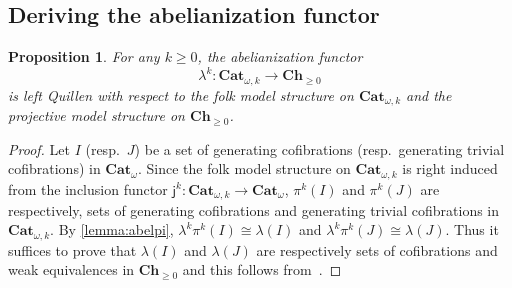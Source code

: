 \documentclass[reqno]{amsart}
\theoremstyle{plain}
\newtheorem{proposition}[subsubsection]{Proposition}
\theoremstyle{definition}
\theoremstyle{remark}
\newcommand{\ctg}[1]{\mathbf{#1}}  %
\newcommand{\Cat}{\ctg{Cat}}   %
\newcommand{\nCat}[1]{\Cat_{#1}}  %
\newcommand{\opCat}[1]{\Cat_{\omega,#1}} %
\newcommand{\oCat}{\nCat{\omega}} %
\newcommand{\Ch}[1]{\ctg{Ch}_{#1}} %
\newcommand{\Chp}{\Ch{\geq 0}} %
\newcommand{\functor}[1]{\mathsf{#1}} %
\newcommand{\emb}[2]{\functor{j}_{#2}^{#1}}%
\newcommand{\pifun}[2]{\functor{\pi}_{#2}^{#1}}%
\newcommand{\oemb}[1]{\emb{#1}{}}%
\newcommand{\opifun}[1]{\pifun{#1}{}}%
\newcommand{\abel}{\functor{\lambda}} %
\newcommand{\abelk}[1]{\functor{\abel}^{#1}}%
\begin{document}
\subsection{Deriving the abelianization functor}\label{subsec:abelderiv}
\begin{proposition}\label{prop:abelquillen}
  For any $k \geq 0$, the abelianization functor
  \[
    \abelk{k} \colon \opCat{k} \to \Chp
  \]
  is left Quillen with respect to the folk model structure on
  $\opCat k$ and the projective model structure on $\Chp$.
\end{proposition}
\begin{proof}
   Let $I$ (resp.\ $J$) be a set of generating cofibrations (resp.\ generating
  trivial cofibrations) in $\oCat$. Since the folk model structure on
  $\opCat k$ is right induced from
  the inclusion functor $\oemb{k} \colon \opCat{k} \to \oCat$,
  $\opifun k(I)$ and $\opifun k(J)$ are respectively, sets of
  generating cofibrations and generating trivial cofibrations in
  $\opCat k$. By \cref{lemma:abelpi}, $\abelk k\opifun k(I)\cong
  \abel(I)$ and  $\abelk k\opifun k(J)\cong \abel(J)$. Thus it
  suffices to prove that $\abel (I)$ and $\abel (J)$ are respectively
  sets of cofibrations and weak equivalences in $\Chp$ and this follows
  from~\cite[Theorem 22.2.7]{abgmmm:polybk}. 
\end{proof}
\end{document}
